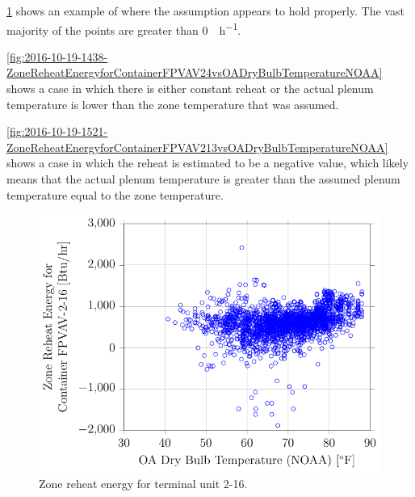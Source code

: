 \figref{}
\ref{fig:2016-10-19-1424-ZoneReheatEnergyforContainerFPVAV216vsOADryBulbTemperatureNOAA}
shows an example of where the assumption appears to hold properly.  The
vast majority of the points are greater than \SI{0}{\BTU\per\hour}.

\figref{}
\ref{fig:2016-10-19-1438-ZoneReheatEnergyforContainerFPVAV24vsOADryBulbTemperatureNOAA}
shows a case in which there is either constant reheat or the actual
plenum temperature is lower than the zone temperature that was assumed.

\figref{}
\ref{fig:2016-10-19-1521-ZoneReheatEnergyforContainerFPVAV213vsOADryBulbTemperatureNOAA}
shows a case in which the reheat is estimated to be a negative value,
which likely means that the actual plenum temperature is greater than
the assumed plenum temperature equal to the zone temperature. 

\begin{figure}
\centering
\includegraphics[]{Plots/2016-10-19-1424-ZoneReheatEnergyforContainerFPVAV216vsOADryBulbTemperatureNOAA.pdf}
\caption{Zone reheat energy for terminal unit 2-16.}
\label{fig:2016-10-19-1424-ZoneReheatEnergyforContainerFPVAV216vsOADryBulbTemperatureNOAA}
\end{figure}

